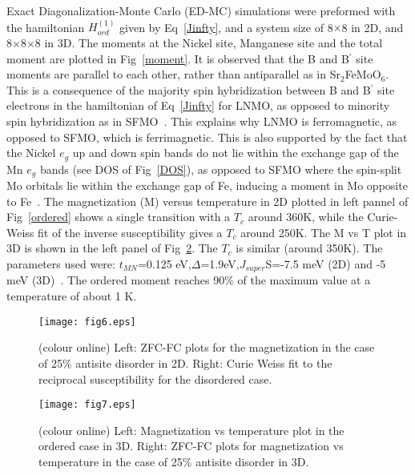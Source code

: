 \documentclass[english,aps,prb,twocolumn,showpacs]{revtex4-1}
\begin{document}
Exact Diagonalization-Monte Carlo (ED-MC) simulations were preformed with the hamiltonian $H^{(1)}_{ord}$
  given by Eq~\ref{Jinfty},
 and a system size of 8$\times$8 in 2D, and 8$\times$8$\times$8 in 3D.
 The moments at the Nickel site, Manganese site and 
 the total moment are plotted in Fig~\ref{moment}. It is observed that
 the B and B$^{\prime}$ site moments are parallel to each other, rather than antiparallel as in Sr$_{2}$FeMoO$_{6}$. 
This is a consequence of the majority spin hybridization between B and B$^{\prime}$ site electrons in the hamiltonian of Eq~\ref{Jinfty} for LNMO, as opposed to minority spin hybridization as in SFMO~\cite{FGuinea}. This explains why LNMO
 is ferromagnetic, as opposed to SFMO, which is ferrimagnetic. This is also supported by the fact that the Nickel 
$e_{g}$ up and down spin bands do not lie within the exchange gap of the Mn $e_{g}$ bands (see DOS of 
 Fig~\ref{DOS}), as opposed to SFMO where the spin-split Mo orbitals lie within the exchange gap of Fe,
inducing a moment in Mo opposite to Fe~\cite{DDSFMO}.  The magnetization (M) versus temperature in 2D plotted in 
left pannel of Fig~\ref{ordered} shows a single transition with a $T_{c}$ around 360K, 
 while the Curie-Weiss fit of the inverse susceptibility
 gives a $T_{c}$ around 250K. The M vs T plot in 3D is shown in the left panel of Fig~\ref{mag3D}. The $T_{c}$ is 
similar (around 350K). The parameters used were: $t_{MN}$=0.125 eV,$\Delta$=1.9eV,$J_{super}$S=-7.5 meV 
(2D) and -5 meV (3D)~\cite{2d3d,Coulomb}. 
 The ordered moment reaches 90$\%$ of the maximum value
 at a temperature of about 1 K. 

\begin{figure}
\texttt{[image: fig6.eps]} \\
\caption{(colour online) Left: ZFC-FC plots for the magnetization in the case of 25$\%$ antisite disorder in 2D.
 Right: Curie Weiss fit to the reciprocal susceptibility for the disordered case.}
\label{disordered}
\end{figure}
\begin{figure}
\texttt{[image: fig7.eps]} \\
\caption{(colour online) Left:  Magnetization vs temperature plot in the ordered case in 3D.
 Right: ZFC-FC plots for magnetization vs temperature in the case of 25$\%$ antisite disorder in 3D.}
\label{mag3D}
\end{figure}
\end{document}
